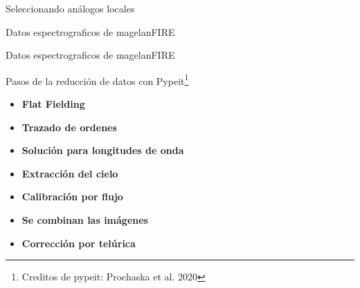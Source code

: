 \documentclass[
	spanish, %
	aspectratio=43, %
	hyperref={pdfencoding=auto,psdextra},
	xcolor={dvipsnames,table,usenames}
]{beamer}
\begin{document}

\begin{frame}{Seleccionando análogos locales}
	
\end{frame}


\begin{frame}{Datos espectrograficos de magelanFIRE}
\end{frame}



\begin{frame}{Datos espectrograficos de magelanFIRE}
\end{frame}


\begin{frame}{Pasos de la reducción de datos con Pypeit\footnote{Creditos de pypeit: Prochaska et al. 2020}}
	
	\begin{itemize}
		\item \textbf{Flat Fielding}
		\item \textbf{Trazado de ordenes}
		\item \textbf{Solución para longitudes de onda}
		\item \textbf{Extracción del cielo}
		\item \textbf{Calibración por flujo}
		\item \textbf{Se combinan las imágenes}
		\item \textbf{Corrección por telúrica}
	\end{itemize}
\end{frame}

\end{document}
